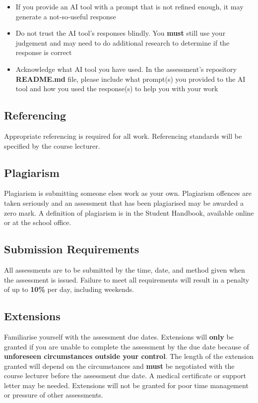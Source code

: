 \documentclass{article}
\begin{document}
\begin{itemize}
    \item If you provide an AI tool with a prompt that is not refined enough, it may generate a not-so-useful response
    \item Do not trust the AI tool's responses blindly. You \textbf{must} still use your judgement and may need to do additional research to determine if the response is correct
    \item Acknowledge what AI tool you have used. In the assessment's repository \textbf{README.md} file, please include what prompt(s) you provided to the AI tool and how you used the response(s) to help you with your work
\end{itemize}

\subsection*{Referencing}
Appropriate referencing is required for all work. Referencing standards will be specified by the course lecturer.

\subsection*{Plagiarism}
Plagiarism is submitting someone elses work as your own. Plagiarism offences are taken seriously and an assessment that has been plagiarised may be awarded a zero mark. A definition of plagiarism is in the Student Handbook, available online or at the school office.

\subsection*{Submission Requirements}
All assessments are to be submitted by the time, date, and method given when the assessment is issued. Failure to meet all requirements will result in a penalty of up to \textbf{10\%} per day, including weekends.

\subsection*{Extensions}
Familiarise yourself with the assessment due dates. Extensions will \textbf{only} be granted if you are unable to complete the assessment by the due date because of \textbf{unforeseen circumstances outside your control}. The length of the extension granted will depend on the circumstances and \textbf{must} be negotiated with the course lecturer before the assessment due date. A medical certificate or support letter may be needed. Extensions will not be granted for poor time management or pressure of other assessments.
\end{document}
